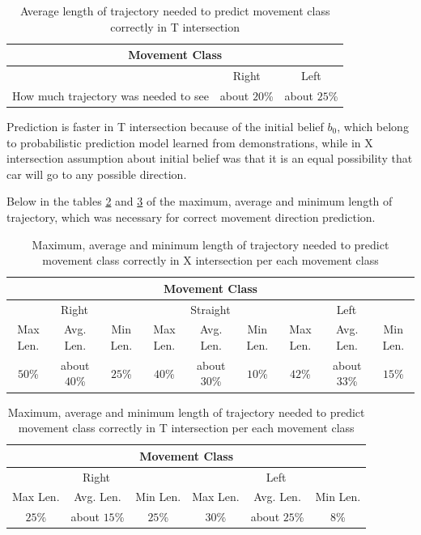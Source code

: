 \begin{table}[h!]
	\centering
	\begin{tabular}{ |c|c|c|}
		\hline
		\multicolumn{3}{|c|}{Movement Class} \\
		\hline
		& Right & Left \\
		\hline
		How much trajectory was needed to see & about $20$\% & about $25$\% \\
		\hline
	\end{tabular}
	\caption{Average length of trajectory needed to predict movement class correctly in T intersection}
	\label{table:avertageT}
\end{table}

Prediction is faster in T intersection because of the initial belief $b_{0}$, which belong to probabilistic prediction model learned from demonstrations, while in X intersection assumption about initial belief was that it is an equal possibility that car will go to any possible direction.

Below in the tables \ref{table:EdgeValuesX} and \ref{table:EdgeValuesT}  of the maximum, average and minimum length of trajectory, which was necessary for correct movement direction prediction. 

\begin{table}[h!]
	\centering
	\begin{tabular}{|c|c|c|c|c|c|c|c|c|}
		\hline
		\multicolumn{9}{|c|}{Movement Class} \\
		\hline
		\multicolumn{3}{|c|}{Right} & \multicolumn{3}{c}{Straight} & \multicolumn{3}{|c|}{Left}\\
		\hline
		Max Len. & Avg. Len. & Min Len. & Max Len. & Avg. Len. & Min Len. & Max Len. & Avg. Len. & Min Len. \\
		\hline
		$50$\% & about $40$\% & $25$\% & $40$\% & about $30$\% & $10$\% & $42$\% & about $33$\% & $15$\% \\
		\hline
	\end{tabular}
	\caption{Maximum, average and minimum length of trajectory needed to predict movement class correctly in X intersection per each movement class}
	\label{table:EdgeValuesX}
\end{table}

\begin{table}[h!]
	\centering
	\begin{tabular}{|c|c|c|c|c|c|}
		\hline
		\multicolumn{6}{|c|}{Movement Class} \\
		\hline
		\multicolumn{3}{|c}{Right} &  \multicolumn{3}{|c|}{Left}\\
		\hline
		Max Len. & Avg. Len. & Min Len. & Max Len. & Avg. Len. & Min Len. \\
		\hline
		$25$\% & about $15$\% & $25$\% & $30$\% & about $25$\% & $8$\% \\
		\hline
	\end{tabular}
	\caption{Maximum, average and minimum length of trajectory needed to predict movement class correctly in T intersection per each movement class}
	\label{table:EdgeValuesT}
\end{table}

